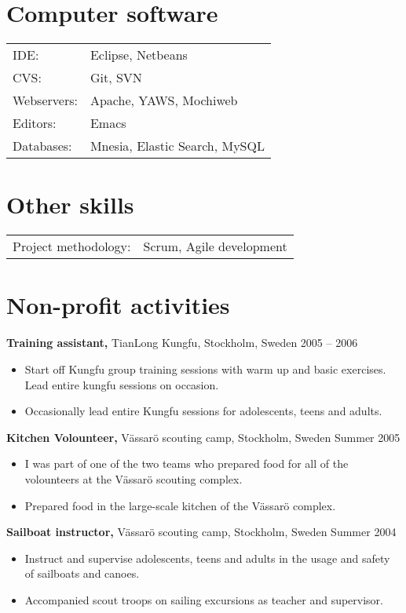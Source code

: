 \documentclass[margin]{res}
\begin{document}
\begin{resume}
\section{Computer software}
\begin{tabular}{l p{3in}}
  IDE: & Eclipse, Netbeans \\
  CVS: & Git, SVN \\
  Webservers: & Apache, YAWS, Mochiweb \\
  Editors: & Emacs \\
  Databases: & Mnesia, Elastic Search, MySQL
\end{tabular}

\section{Other skills}
\begin{tabular}{l p{3in}}
  Project methodology: & Scrum, Agile development
\end{tabular}

\section{Non-profit activities}
{\bf Training assistant,} TianLong Kungfu, Stockholm, Sweden \hfill 2005 -- 2006
\begin{itemize} \itemsep -2pt
\item Start off Kungfu group training sessions with warm up and basic exercises. Lead entire kungfu sessions on occasion.
\item Occasionally lead entire Kungfu sessions for adolescents, teens and adults.
\end{itemize}

{\bf Kitchen Volounteer,} Vässarö scouting camp, Stockholm, Sweden \hfill Summer 2005
\begin{itemize} \itemsep -2pt
\item I was part of one of the two teams who prepared food for all of the volounteers at the Vässarö scouting complex.
\item Prepared food in the large-scale kitchen of the Vässarö complex.
\end{itemize}

{\bf Sailboat instructor,} Vässarö scouting camp, Stockholm, Sweden \hfill Summer 2004
\begin{itemize} \itemsep -2pt
\item Instruct and supervise adolescents, teens and adults in the usage and safety of sailboats and canoes.
\item Accompanied scout troops on sailing excursions as teacher and supervisor.
\end{itemize}


\end{resume}
\end{document}

